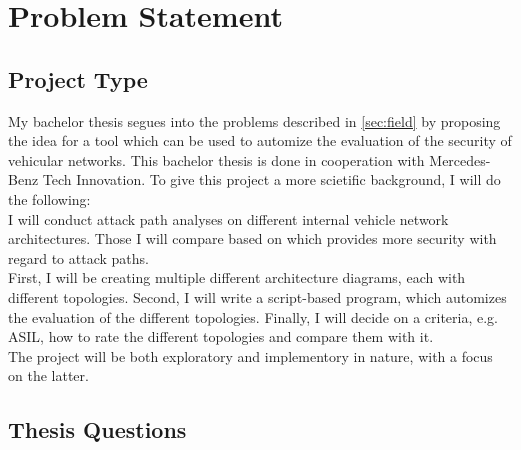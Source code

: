 
\chapter{Problem Statement}
\label{sec:problem}

\section{Project Type}\label{sec:type}

My bachelor thesis segues into the problems described in \ref{sec:field} by proposing the idea for a tool which can be used to automize the evaluation of the security of vehicular networks.
This bachelor thesis is done in cooperation with Mercedes-Benz Tech Innovation.
To give this project a more scietific background, I will do the following: \\

I will conduct attack path analyses on different internal vehicle network architectures.
Those I will compare based on which provides more security with regard to attack paths.\\

First, I will be creating multiple different architecture diagrams, each with different topologies.
Second, I will write a script-based program, which automizes the evaluation of the different topologies.
Finally, I will decide on a criteria, e.g. ASIL, how to rate the different topologies and compare them with it.\\

The project will be both exploratory and implementory in nature, with a focus on the latter.


\section{Thesis Questions}\label{sec:questions}





